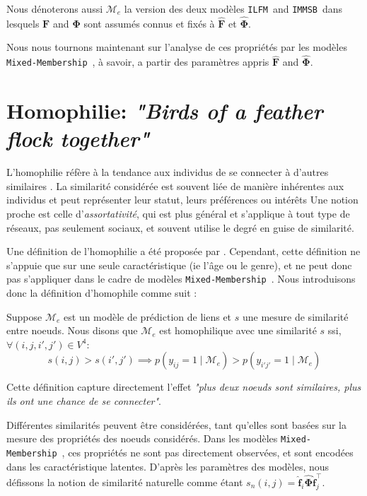 \documentclass[french]{hermes-journal}
\newcommand{\ilfm}{\texttt{ILFM}}
\newcommand{\immsb}{\texttt{IMMSB}}
\newcommand{\mmm}{\texttt{Mixed-Membership}~}
\newcommand{\pr}{p}
\newcommand{\mat}[1]{\bm{#1}}
\begin{document}
Nous dénoterons aussi $\mathcal{M}_e$ la version des deux modèles \ilfm\ and \immsb\ dans lesquels $\mat{F}$ and $\mat{\Phi}$ sont assumés connus et fixés à $\mat{\hat{F}}$ et  $\mat{\hat{\Phi}}$.

Nous nous tournons maintenant sur l'analyse de ces propriétés par les modèles \mmm, à savoir, a partir des paramètres appris $\mat{\hat{F}}$ and $\mat{\hat{\Phi}}$.


\section{Homophilie: \emph{"Birds of a feather flock together"}}
\label{sec:homophily}

L'homophilie réfère à la tendance aux individus de se connecter à d'autres similaires  \cite{mcpherson2001birds,lazarsfeld1954friendship}. La similarité considérée est souvent liée de manière inhérentes aux individus et peut représenter leur statut, leurs préférences ou intérêts Une notion proche est celle d'\emph{assortativité}, qui est plus général et s'applique à tout type de réseaux, pas seulement sociaux, et souvent utilise le degré en guise de similarité.


Une définition de l'homophilie a été proposée par \cite{la2010randomization}. Cependant, cette définition ne s'appuie que sur une seule caractéristique (ie l'âge ou le genre), et ne peut donc pas s'appliquer dans le cadre de modèles \mmm. Nous introduisons donc la définition d'homophile comme suit : 
\begin{definition}[Homophilie] \label{def:homophily}
    Suppose $\mathcal{M}_e$ est un modèle de prédiction de liens et $s$ une mesure de similarité entre noeuds. Nous disons que $\mathcal{M}_e$ est homophilique avec une similarité $s$ ssi, $\forall (i,j,i',j') \in V^4$:
\begin{equation}
s(i,j) > s(i',j')  \implies \pr(y_{ij}=1 \mid \mathcal{M}_e) > \pr(y_{i'j'}=1  \mid \mathcal{M}_e) \nonumber
\end{equation}

\end{definition}

\noindent Cette définition capture directement l'effet \emph{"plus deux noeuds sont similaires, plus ils ont une chance de se connecter"}. 

Différentes similarités peuvent être considérées, tant qu'elles sont basées sur la mesure des propriétés des noeuds considérés. Dans les modèles \mmm, ces propriétés ne sont pas directement observées, et sont encodées dans les caractéristique latentes. D'après les paramètres des modèles, nous défissons la notion de similarité naturelle comme étant $s_n(i,j) = \mat{\hat{f}}_{i} \mat{\hat{\Phi}} \mat{\hat{f}}_j^\top$.
\end{document}

